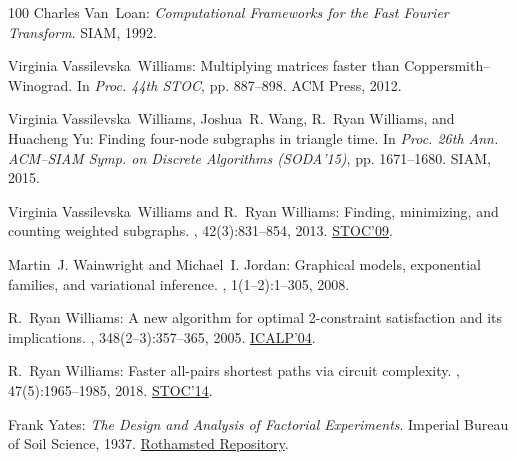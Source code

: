 \begin{thebibliography}{100}
{\sc Charles Van~Loan}: {\em Computational Frameworks for the Fast Fourier
  Transform}.
\newblock SIAM, 1992.
\newblock [\epfmtdoi{10.1137/1.9781611970999}]

{\sc Virginia Vassilevska~Williams}: Multiplying matrices faster than
  {C}oppersmith--{W}inograd.
\newblock In {\em Proc. 44th STOC}, pp. 887--898. ACM Press, 2012.
\newblock [\epfmtdoi{10.1145/2213977.2214056}]

{\sc Virginia Vassilevska~Williams, Joshua~R. Wang, R.~Ryan Williams, and
  Huacheng Yu}: Finding four-node subgraphs in triangle time.
\newblock In {\em Proc. 26th Ann. ACM--SIAM Symp. on Discrete Algorithms
  (SODA'15)}, pp. 1671--1680. SIAM, 2015.
\newblock [\epfmtdoi{10.1137/1.9781611973730.111}]

{\sc Virginia Vassilevska~Williams and R.~Ryan Williams}: Finding, minimizing,
  and counting weighted subgraphs.
, 42(3):831--854, 2013.
\newblock \prelim \href {https://doi.org/10.1145/1536414.1536477}{STOC'09}.
\newblock [\epfmtdoi{10.1137/09076619X}]

{\sc Martin~J. Wainwright and Michael~I. Jordan}: Graphical models, exponential
  families, and variational inference.
, 1(1--2):1--305, 2008.
\newblock [\epfmtdoi{10.1561/2200000001}]

{\sc R.~Ryan Williams}: A new algorithm for optimal 2-constraint satisfaction
  and its implications.
, 348(2--3):357--365, 2005.
\newblock \prelim
  \href{https://doi.org/10.1007/978-3-540-27836-8\_101}{ICALP'04}.

{\sc R.~Ryan Williams}: Faster all-pairs shortest paths via circuit complexity.
, 47(5):1965--1985, 2018.
\newblock \prelim \href{https://doi.org/10.1145/2591796.2591811}{STOC'14}.
\newblock [\epfmtdoi{10.1137/15M1024524}]

{\sc Frank Yates}: {\em The Design and Analysis of Factorial Experiments}.
\newblock Imperial Bureau of Soil Science, 1937.
\newblock
  \href{https://repository.rothamsted.ac.uk/download/da923ac105983581f7731b3062a119a7e690931c120a16aad0550dd9c527e8fe/10768968/The\%20Design\%20and\%20Analysis.pdf}{Rothamsted
  Repository}.

\end{thebibliography}